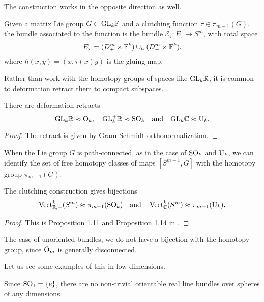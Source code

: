 The construction works in the opposite direction as well.

\begin{definition}
	Given a matrix Lie group $G\subset \mathrm{GL}_k\mathbb{F}$ and a clutching function $\tau\in \pi_{m-1}(G)$, the bundle associated to the function is the bundle $\mathcal{E}_\tau : E_\tau \to S^{m}$, with total space
	\[
		E_\tau = (D_+^m\times \mathbb{F}^k)\cup_h (D_-^{m}\times \mathbb{F}^k),
	\]
	where $h(x,y)=(x,\tau(x)y)$ is the gluing map.
\end{definition}

Rather than work with the homotopy groups of spaces like $\mathrm{GL}_k\mathbb{R}$, it is common to deformation retract them to compact subspaces.

\begin{proposition}
	There are deformation retracts
	\[
		\mathrm{GL}_k\mathbb{R} \approx \mathrm{O}_k,\quad \mathrm{GL}_k^+\mathbb{R} \approx \mathrm{SO}_k\quad\textrm{and}\quad \mathrm{GL}_k\mathbb{C} \approx \mathrm{U}_k.
	\]
\end{proposition}
\begin{proof}
	The retract is given by Gram-Schmidt orthonormalization.
\end{proof}

When the Lie group $G$ is path-connected, as in the case of $\mathrm{SO}_k$ and $\mathrm{U}_k$, we can identify the set of free homotopy classes of maps $[S^{m-1}, G]$ with the homotopy group $\pi_{m-1}(G)$.

\begin{theorem}
	The clutching construction gives bijections
	\[
		\operatorname{Vect}_{\mathbb{R},+}^k(S^m) \approx \pi_{m-1}(\mathrm{SO}_k)\quad\textrm{and}\quad
		\operatorname{Vect}_{\mathbb{C}}^k(S^m) \approx \pi_{m-1}(\mathrm{U}_k).
	\]
\end{theorem}
\begin{proof}
	This is Proposition 1.11 and Proposition 1.14 in \cite{hatcher2003ktheory}.
\end{proof}

\begin{remark}
	The case of unoriented bundles, we do not have a bijection with the homotopy group, since $\mathrm{O}_m$ is generally disconnected.
\end{remark}

Let us see some examples of this in low dimensions.

\begin{example}
	Since $\mathrm{SO}_1 = \{e\}$, there are no non-trivial orientable real line bundles over spheres of any dimensions.
\end{example}

